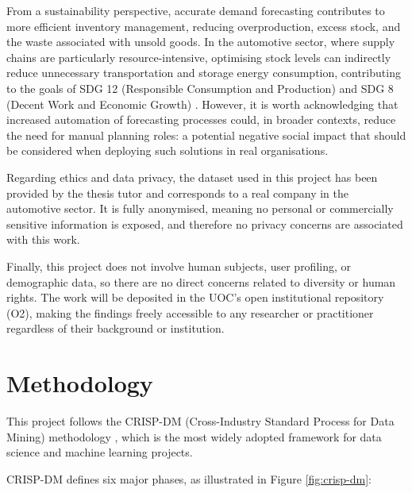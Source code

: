 \documentclass[ENG]{TFUOC}%
\begin{document}
From a sustainability perspective, accurate demand forecasting 
contributes to more efficient inventory management, reducing 
overproduction, excess stock, and the waste associated with unsold 
goods. In the automotive sector, where supply chains are particularly 
resource-intensive, optimising stock levels can indirectly reduce 
unnecessary transportation and storage energy consumption, 
contributing to the goals of SDG 12 (Responsible Consumption and 
Production) and SDG 8 (Decent Work and Economic Growth) \citep{undp_sdg}. However, 
it is worth acknowledging that increased automation of forecasting 
processes could, in broader contexts, reduce the need for manual 
planning roles: a potential negative social impact that should be 
considered when deploying such solutions in real organisations.

Regarding ethics and data privacy, the dataset used in this project 
has been provided by the thesis tutor and corresponds to a real 
company in the automotive sector. It is fully anonymised, meaning 
no personal or commercially sensitive information is exposed, and 
therefore no privacy concerns are associated with this work.

Finally, this project does not involve human subjects, user 
profiling, or demographic data, so there are no direct concerns 
related to diversity or human rights. The work will be deposited 
in the UOC's open institutional repository (O2), making the 
findings freely accessible to any researcher or practitioner 
regardless of their background or institution.

\section{Methodology}

This project follows the CRISP-DM (Cross-Industry Standard 
Process for Data Mining) methodology \citep{wirth2000crisp}, which 
is the most widely adopted framework for data science and machine 
learning projects.

CRISP-DM defines six major phases, as illustrated in Figure 
\ref{fig:crisp-dm}:
\end{document}
